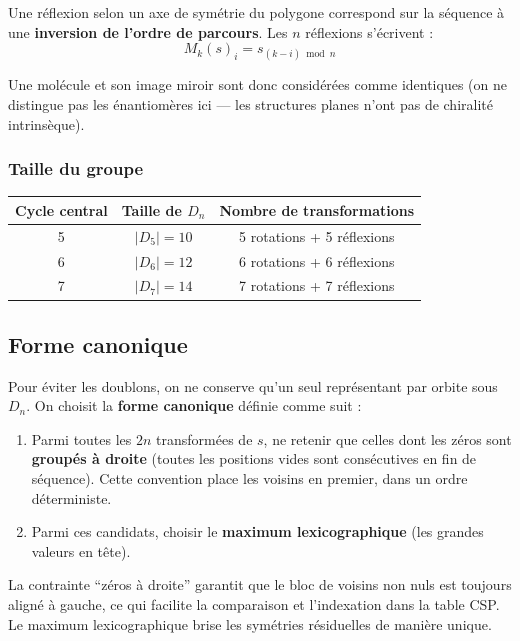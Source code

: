 \documentclass[a4paper,12pt]{article}
\begin{document}
Une réflexion selon un axe de symétrie du polygone correspond sur la séquence à une
\textbf{inversion de l'ordre de parcours}. Les $n$ réflexions s'écrivent :
\[
  M_k(s)_i = s_{(k - i) \bmod n}
\]

Une molécule et son image miroir sont donc considérées comme identiques (on ne distingue pas
les énantiomères ici — les structures planes n'ont pas de chiralité intrinsèque).

\subsubsection{Taille du groupe}

\begin{center}
\begin{tabular}{ccc}
  \toprule
  Cycle central & Taille de $D_n$ & Nombre de transformations \\
  \midrule
  5 & $|D_5| = 10$ & 5 rotations + 5 réflexions \\
  6 & $|D_6| = 12$ & 6 rotations + 6 réflexions \\
  7 & $|D_7| = 14$ & 7 rotations + 7 réflexions \\
  \bottomrule
\end{tabular}
\end{center}

\subsection{Forme canonique}

Pour éviter les doublons, on ne conserve qu'un seul représentant par orbite sous $D_n$. On
choisit la \textbf{forme canonique} définie comme suit :

\begin{enumerate}
  \item Parmi toutes les $2n$ transformées de $s$, ne retenir que celles dont les zéros sont
    \textbf{groupés à droite} (toutes les positions vides sont consécutives en fin de séquence).
    Cette convention place les voisins en premier, dans un ordre déterministe.
  \item Parmi ces candidats, choisir le \textbf{maximum lexicographique} (les grandes valeurs
    en tête).
\end{enumerate}

\begin{remarque}
  La contrainte ``zéros à droite'' garantit que le bloc de voisins non nuls est toujours
  aligné à gauche, ce qui facilite la comparaison et l'indexation dans la table CSP.
  Le maximum lexicographique brise les symétries résiduelles de manière unique.
\end{remarque}
\end{document}
